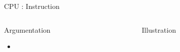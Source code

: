 \begin{Frame}{CPU : Instruction}
 \begin{columns}[t]
  \begin{column}{\BW}
    \begin{block}{Argumentation}
      \begin{itemize}
        \item
      \end{itemize}
    \end{block}
  \end{column}
  \begin{column}{\BW}
    \begin{block}{Illustration}
    \end{block}
  \end{column}

 \end{columns}
\end{Frame}
